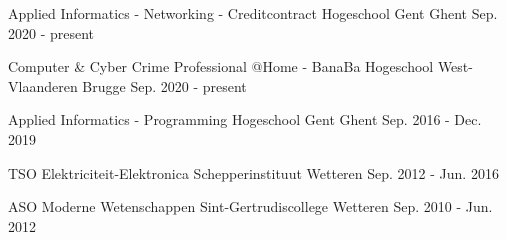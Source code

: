 

\begin{cventries}
	
\cventry
{Applied Informatics - Networking - Creditcontract} %
{Hogeschool Gent} %
{Ghent} %
{Sep. 2020 - present} %
{
}

\cventry
{Computer \& Cyber Crime Professional @Home - BanaBa} %
{Hogeschool West-Vlaanderen} %
{Brugge} %
{Sep. 2020 - present} %
{
}

\cventry
{Applied Informatics - Programming} %
{Hogeschool Gent} %
{Ghent} %
{Sep. 2016 - Dec. 2019} %
{
}

\cventry
{TSO Elektriciteit-Elektronica} %
{Schepperinstituut} %
{Wetteren} %
{Sep. 2012 - Jun. 2016} %
{
}

  \cventry
    {ASO Moderne Wetenschappen} %
    {Sint-Gertrudiscollege} %
    {Wetteren} %
    {Sep. 2010 - Jun. 2012} %
    {
    }

\end{cventries}

